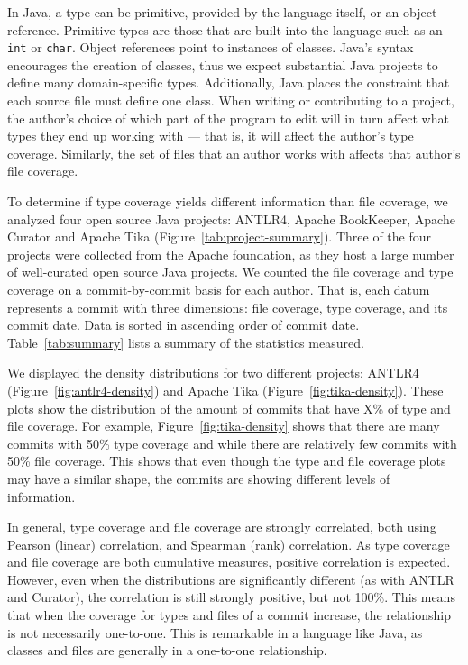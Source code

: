 In Java, a type can be primitive, provided by the language itself, or an object reference. Primitive types are those that are built into the language such as an \texttt{int} or \texttt{char}. Object references point to instances of classes. Java's syntax encourages the creation of classes, thus we expect substantial Java projects to define many domain-specific types. Additionally, Java places the constraint that each source file must define one class. When writing or contributing to a project, the author's choice of which part of the program to edit will in turn affect what types they end up working with --- that is, it will affect the author's type coverage. Similarly, the set of files that an author works with affects that author's file coverage.

To determine if type coverage yields different information than file coverage, we analyzed four open source Java projects: ANTLR4, Apache BookKeeper, Apache Curator and Apache Tika (Figure~\ref{tab:project-summary}). Three of the four projects were collected from the Apache foundation, as they host a large number of well-curated open source Java projects. We counted the file coverage and type coverage on a commit-by-commit basis for each author. That is, each datum represents a commit with three dimensions: file coverage, type coverage, and its commit date. Data is sorted in ascending order of commit date. Table~\ref{tab:summary} lists a summary of the statistics measured.

We displayed the density distributions for two different projects: ANTLR4 (Figure~\ref{fig:antlr4-density}) and Apache Tika (Figure~\ref{fig:tika-density}). These plots show the distribution of the amount of commits that have X\% of type and file coverage. For example, Figure~\ref{fig:tika-density} shows that there are many commits with 50\% type coverage and while there are relatively few commits with 50\% file coverage. This shows that even though the type and file coverage plots may have a similar shape, the commits are showing different levels of information. 

In general, type coverage and file coverage are strongly correlated, both using Pearson (linear) correlation, and Spearman (rank) correlation. As type coverage and file coverage are both cumulative measures, positive correlation is expected. However, even when the distributions are significantly different (as with ANTLR and Curator), the correlation is still strongly positive, but not 100\%. This means that when the coverage for types and files of a commit increase, the relationship is not necessarily one-to-one. This is remarkable in a language like Java, as classes and files are generally in a one-to-one relationship.

